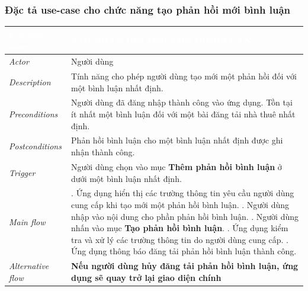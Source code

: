 \subsubsection{Đặc tả use-case cho chức năng tạo phản hồi mới bình luận}
\begin{center}
    \arrayrulewidth=2pt
    \begin{longtable}{
        |>{\raggedright\arraybackslash}p{3cm}
        |>{\raggedright\arraybackslash}p{13cm}
        |}
        \hline
        \rowcolor{cyan!75!black} \textcolor{white}{\textbf{Use-case name}} & \textcolor{white}{\textbf{TẠO PHẢN HỒI MỚI CHO BÌNH LUẬN}}
        \\\hline
        \rowcolor{cyan!10!white} \textit{Actor} & Người dùng
        \\\hdashline
        \rowcolor{cyan!10!white} \textit{Description} & Tính năng cho phép người dùng tạo mới một phản hồi đối với một bình luận nhất định.
        \\\hdashline
        \rowcolor{cyan!10!white} \textit{Preconditions} & Người dùng đã đăng nhập thành công vào ứng dụng. Tồn tại ít nhất một bình luận đối với một bài đăng tải nhà thuê nhất định.
        \\\hdashline
        \rowcolor{cyan!10!white} \textit{Postconditions} & Phản hồi bình luận cho một bình luận nhất định được ghi nhận thành công.
        \\\hdashline
        \rowcolor{cyan!10!white} \textit{Trigger} & Người dùng chọn vào mục \textbf{Thêm phản hồi bình luận} ở dưới một bình luận nhất định.
        \\\hdashline
        \rowcolor{cyan!10!white} \textit{Main flow} &
        1. Ứng dụng hiển thị các trường thông tin yêu cầu người dùng cung cấp khi tạo mới một phản hồi bình luận. \newline
        2. Người dùng nhập vào nội dung cho phần phản hồi bình luận. \newline
        3. Người dùng nhấn vào mục \textbf{Tạo phản hồi bình luận}. \newline
        4. Ứng dụng kiểm tra và xử lý các trường thông tin do người dùng cung cấp. \newline
        5. Ứng dụng thông báo đăng tải phản hồi bình luận thành công.
        \\\hdashline
        \rowcolor{cyan!10!white} \textit{Alternative flow} & 
        \textbf{Nếu người dùng hủy đăng tải phản hồi bình luận, ứng dụng sẽ quay trở lại giao diện chính} \newline

\end{longtable}
\end{center}
